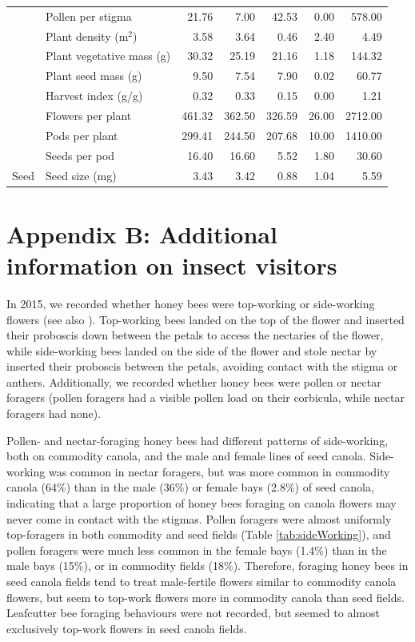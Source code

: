 \begin{table}[h]
\begin{tabular}{l|l|r|r|r|r|r}
\cline{2-7}
 & Pollen per stigma & 21.76 & 7.00 & 42.53 & 0.00 & 578.00\\
\cline{2-7}
 & Plant density (m$^2$) & 3.58 & 3.64 & 0.46 & 2.40 & 4.49\\
\cline{2-7}
 & Plant vegetative mass (g) & 30.32 & 25.19 & 21.16 & 1.18 & 144.32\\
\cline{2-7}
 & Plant seed mass (g) & 9.50 & 7.54 & 7.90 & 0.02 & 60.77\\
\cline{2-7}
 & Harvest index (g/g) & 0.32 & 0.33 & 0.15 & 0.00 & 1.21\\
\cline{2-7}
 & Flowers per plant & 461.32 & 362.50 & 326.59 & 26.00 & 2712.00\\
\cline{2-7}
 & Pods per plant & 299.41 & 244.50 & 207.68 & 10.00 & 1410.00\\
\cline{2-7}
 & Seeds per pod & 16.40 & 16.60 & 5.52 & 1.80 & 30.60\\
\cline{2-7}
\multirow{-15}{*}{\raggedright\arraybackslash Seed} & Seed size (mg) & 3.43 & 3.42 & 0.88 & 1.04 & 5.59\\
\hline
\end{tabular}

\label{tab:dataSummary}
\end{table}

\clearpage

\section*{Appendix B: Additional information on insect visitors}

In 2015, we recorded whether honey bees were top-working or side-working flowers (see also \citealp{free1973, free1983, mohr1988}).
Top-working bees landed on the top of the flower and inserted their proboscis down between the petals to access the nectaries of the flower, while side-working bees landed on the side of the flower and stole nectar by inserted their proboscis between the petals, avoiding contact with the stigma or anthers. 
Additionally, we recorded whether honey bees were pollen or nectar foragers (pollen foragers had a visible pollen load on their corbicula, while nectar foragers had none).

Pollen- and nectar-foraging honey bees had different patterns of side-working, both on commodity canola, and the male and female lines of seed canola.
Side-working was common in nectar foragers, but was more common in commodity canola (64\%) than in the male (36\%) or female bays (2.8\%) of seed canola, indicating that a large proportion of honey bees foraging on canola flowers may never come in contact with the stigmas.
Pollen foragers were almost uniformly top-foragers in both commodity and seed fields (Table \ref{tab:sideWorking}), and pollen foragers were much less common in the female bays (1.4\%) than in the male bays (15\%), or in commodity fields (18\%).
Therefore, foraging honey bees in seed canola fields tend to treat male-fertile flowers similar to commodity canola flowers, but seem to top-work flowers more in commodity canola than seed fields.
Leafcutter bee foraging behaviours were not recorded, but seemed to almost exclusively top-work flowers in seed canola fields.


